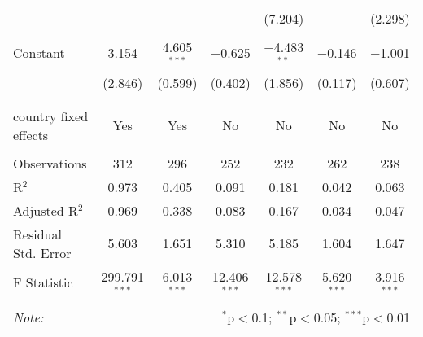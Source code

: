 \begin{tabular}{@{\extracolsep{5pt}}lcccccc}
  &  &  &  & (7.204) &  & (2.298) \\ 
  & & & & & & \\ 
 Constant & 3.154 & 4.605$^{***}$ & $-$0.625 & $-$4.483$^{**}$ & $-$0.146 & $-$1.001 \\ 
  & (2.846) & (0.599) & (0.402) & (1.856) & (0.117) & (0.607) \\ 
  & & & & & & \\ 
\hline \\[-1.8ex] 
country fixed effects & Yes & Yes & No & No & No & No \\ 
\hline \\[-1.8ex] 
Observations & 312 & 296 & 252 & 232 & 262 & 238 \\ 
R$^{2}$ & 0.973 & 0.405 & 0.091 & 0.181 & 0.042 & 0.063 \\ 
Adjusted R$^{2}$ & 0.969 & 0.338 & 0.083 & 0.167 & 0.034 & 0.047 \\ 
Residual Std. Error & 5.603 & 1.651 & 5.310 & 5.185 & 1.604 & 1.647 \\ 
F Statistic & 299.791$^{***}$ & 6.013$^{***}$ & 12.406$^{***}$ & 12.578$^{***}$ & 5.620$^{***}$ & 3.916$^{***}$ \\ 
\hline 
\hline \\[-1.8ex] 
\textit{Note:}  & \multicolumn{6}{r}{$^{*}$p$<$0.1; $^{**}$p$<$0.05; $^{***}$p$<$0.01} \\ 
\end{tabular} 
\endgroup 
